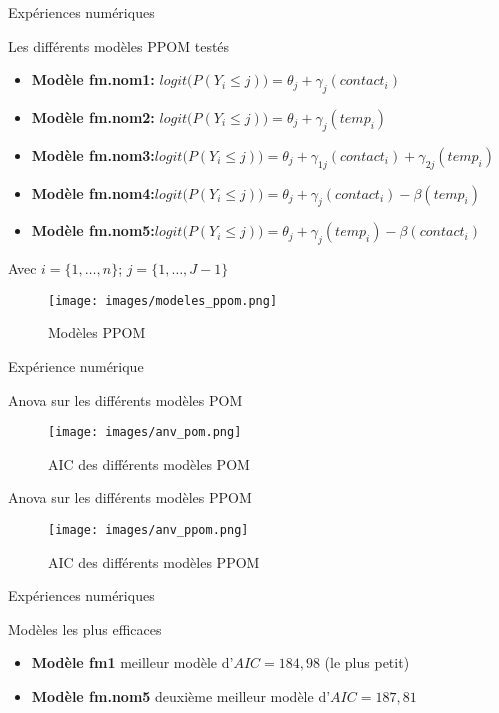 \documentclass[11pt]{beamer}
\begin{document}
	\begin{frame}{Expériences numériques}
		\scriptsize
		\begin{block}{Les différents modèles PPOM testés}
			\begin{itemize}
				\item \textbf{Modèle fm.nom1:} $logit\big( P(Y_i \leq j) \big) = \theta_j + \gamma_j(contact_i)$ \\
				\item \textbf{Modèle fm.nom2:} $logit\big( P(Y_i \leq j) \big) = \theta_j + \gamma_j(temp_i)$ \\
				\item \textbf{Modèle fm.nom3:}$logit\big( P(Y_i \leq j) \big) = \theta_j + \gamma_{1j}(contact_i) + \gamma_{2j}(temp_i)$ \\
				\item \textbf{Modèle fm.nom4:}$logit\big( P(Y_i \leq j) \big) = \theta_j + \gamma_j(contact_i) - \beta(temp_i)$ \\
				\item \textbf{Modèle fm.nom5:}$logit\big( P(Y_i \leq j) \big) = \theta_j + \gamma_j(temp_i) - \beta(contact_i)$
			\end{itemize}
			Avec $i = \{1, \dots ,n\}$; $j = \{1, \dots ,J-1\}$
			\begin{figure}[H]
				\centering
				\texttt{[image: images/modeles\_ppom.png]}
				\caption{Modèles PPOM}
			\end{figure}
		\end{block}
	\end{frame}
	
	\begin{frame}{Expérience numérique}
		\begin{block}{Anova sur les différents modèles POM}
			\begin{figure}[H]
				\centering
				\texttt{[image: images/anv\_pom.png]}
				\caption{AIC des différents modèles POM}
			\end{figure}
		\end{block}
		\begin{block}{Anova sur les différents modèles PPOM}
			\begin{figure}[H]
				\centering
				\texttt{[image: images/anv\_ppom.png]}
				\caption{AIC des différents modèles PPOM}
			\end{figure}
		\end{block}
	\end{frame}
	
	\begin{frame}{Expériences numériques}
		\begin{block}{Modèles les plus efficaces}
			\begin{itemize}
				\item \textbf{Modèle fm1 } meilleur modèle d'$AIC = 184,98$ (le plus petit) \\
				\item \textbf{Modèle fm.nom5} deuxième meilleur modèle d'$AIC = 187,81$
			\end{itemize}
		\end{block}
	\end{frame}
	
\end{document}
